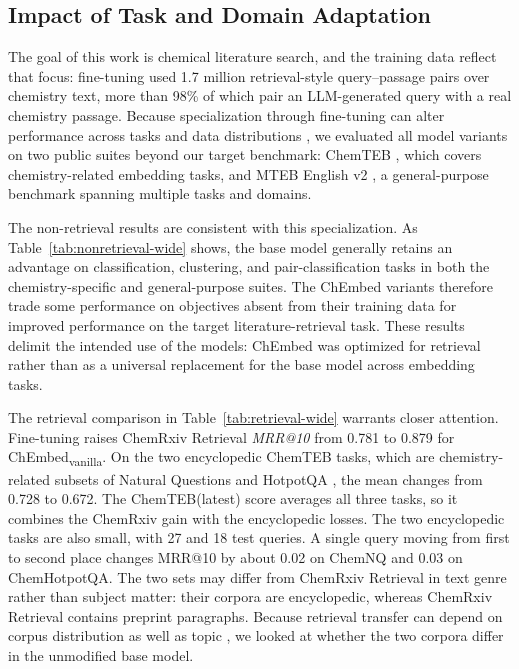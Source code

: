 \documentclass[twoside,twocolumn,9pt]{article}
\begin{document}
\subsection{Impact of Task and Domain Adaptation}
\label{subsec:adaptation-impact}
The goal of this work is chemical literature search, and the training data reflect that focus: fine-tuning used 1.7 million retrieval-style query--passage pairs over chemistry text, more than 98\% of which pair an LLM-generated query with a real chemistry passage. Because specialization through fine-tuning can alter performance across tasks and data distributions \citep{mosbach2023analyzing}, we evaluated all model variants on two public suites beyond our target benchmark: ChemTEB \cite{pmlr-v262-shiraee-kasmaee24a}, which covers chemistry-related embedding tasks, and MTEB English v2 \citep{muennighoff2022mteb}, a general-purpose benchmark spanning multiple tasks and domains.

The non-retrieval results are consistent with this specialization. As Table~\ref{tab:nonretrieval-wide} shows, the base model generally retains an advantage on classification, clustering, and pair-classification tasks in both the chemistry-specific and general-purpose suites. The ChEmbed variants therefore trade some performance on objectives absent from their training data for improved performance on the target literature-retrieval task. These results delimit the intended use of the models: ChEmbed was optimized for retrieval rather than as a universal replacement for the base model across embedding tasks.

The retrieval comparison in Table~\ref{tab:retrieval-wide} warrants closer attention. Fine-tuning raises ChemRxiv Retrieval \textit{MRR@10} from 0.781 to 0.879 for ChEmbed\textsubscript{vanilla}. On the two encyclopedic ChemTEB tasks, which are chemistry-related subsets of Natural Questions and HotpotQA \cite{kwiatkowski2019natural,yang2018hotpotqa}, the mean changes from 0.728 to 0.672. The ChemTEB(latest) score averages all three tasks, so it combines the ChemRxiv gain with the encyclopedic losses. The two encyclopedic tasks are also small, with 27 and 18 test queries. A single query moving from first to second place changes MRR@10 by about 0.02 on ChemNQ and 0.03 on ChemHotpotQA. The two sets may differ from ChemRxiv Retrieval in text genre rather than subject matter: their corpora are encyclopedic, whereas ChemRxiv Retrieval contains preprint paragraphs. Because retrieval transfer can depend on corpus distribution as well as topic \cite{thakur2021beir}, we looked at whether the two corpora differ in the unmodified base model.
\end{document}
